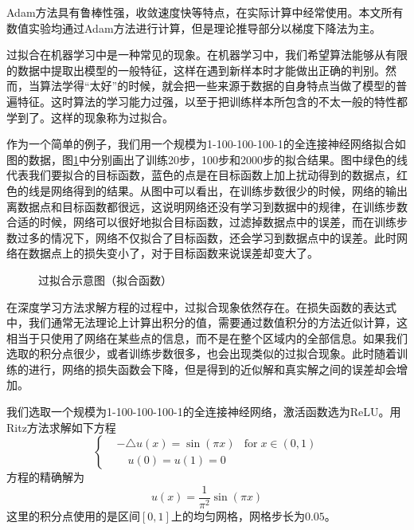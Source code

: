 Adam方法具有鲁棒性强，收敛速度快等特点，在实际计算中经常使用。本文所有数值实验均通过Adam方法进行计算，但是理论推导部分以梯度下降法为主。


过拟合在机器学习中是一种常见的现象。在机器学习中，我们希望算法能够从有限的数据中提取出模型的一般特征，这样在遇到新样本时才能做出正确的判别。然而，当算法学得“太好”的时候，就会把一些来源于数据的自身特点当做了模型的普遍特征。这时算法的学习能力过强，以至于把训练样本所包含的不太一般的特性都学到了。这样的现象称为过拟合。

作为一个简单的例子，我们用一个规模为1-100-100-100-1的全连接神经网络拟合如图的数据，图\ref{fig1-1}中分别画出了训练20步，100步和2000步的拟合结果。图中绿色的线代表我们要拟合的目标函数，蓝色的点是在目标函数上加上扰动得到的数据点，红色的线是网络得到的结果。从图中可以看出，在训练步数很少的时候，网络的输出离数据点和目标函数都很远，这说明网络还没有学习到数据中的规律，在训练步数合适的时候，网络可以很好地拟合目标函数，过滤掉数据点中的误差，而在训练步数过多的情况下，网络不仅拟合了目标函数，还会学习到数据点中的误差。此时网络在数据点上的损失变小了，对于目标函数来说误差却变大了。
\begin{figure}[htbp]
\centering
{}
\caption{过拟合示意图（拟合函数）}
\label{fig1-1}
\end{figure}

在深度学习方法求解方程的过程中，过拟合现象依然存在。在损失函数的表达式中，我们通常无法理论上计算出积分的值，需要通过数值积分的方法近似计算，这相当于只使用了网络在某些点的信息，而不是在整个区域内的全部信息。如果我们选取的积分点很少，或者训练步数很多，也会出现类似的过拟合现象。此时随着训练的进行，网络的损失函数会下降，但是得到的近似解和真实解之间的误差却会增加。

我们选取一个规模为1-100-100-100-1的全连接神经网络，激活函数选为$\mathrm{ReLU}$。用Ritz方法求解如下方程
\begin{equation}
\left\{
\begin{split}
& -\triangle u(x) = \sin(\pi x) & \text{for} \; x \in (0, 1) \\
& \quad u(0) = u(1) = 0
\end{split}
\right.
\end{equation}
方程的精确解为
\begin{equation}
u(x) = \frac{1}{\pi^2} \sin(\pi x)
\end{equation}
这里的积分点使用的是区间$[0,1]$上的均匀网格，网格步长为$0.05$。

